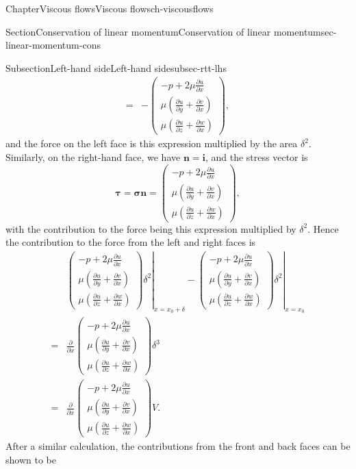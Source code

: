\documentclass[oneside,10pt,]{book}
\numberwithin{equation}{section}
\newcommand{\pd}[2]{\frac{\partial#1}{\partial#2}}
\newcommand{\bn}{\boldsymbol{n}}
\newcommand{\bsigma}{\boldsymbol{\sigma}}
\newcommand{\btau}{\boldsymbol{\tau}}
\newcommand{\bi}{\boldsymbol{i}}
\begin{document}
\begin{chapterptx}{Chapter}{Viscous flows}{}{Viscous flows}{}{}{ch-viscousflows}
\begin{sectionptx}{Section}{Conservation of linear momentum}{}{Conservation of linear momentum}{}{}{sec-linear-momentum-cons}
\begin{subsectionptx}{Subsection}{Left-hand side}{}{Left-hand side}{}{}{subsec-rtt-lhs}
\begin{align*}
=&-\left(\begin{matrix}
-p+2\mu\pd{u}{x}\\
\mu\left(\pd{u}{y}+\pd{v}{x}\right)\\
\mu\left(\pd{u}{z}+\pd{w}{x}\right)
\end{matrix}\right),
\end{align*}
and the force on the left face is this expression multiplied by the area \(\delta^2\). Similarly, on the right-hand face, we have \(\bn=\bi\), and the stress vector is%
\begin{equation*}
\btau=\bsigma\bn
=\left(\begin{matrix}
-p+2\mu\pd{u}{x}\\
\mu\left(\pd{u}{y}+\pd{v}{x}\right)\\
\mu\left(\pd{u}{z}+\pd{w}{x}\right)
\end{matrix}\right),
\end{equation*}
with the contribution to the force being this expression multiplied by \(\delta^2\). Hence the contribution to the force from the left and right faces is%
\begin{align*}
&\left.\left(\begin{matrix}
-p+2\mu\pd{u}{x}\\
\mu\left(\pd{u}{y}+\pd{v}{x}\right)\\
\mu\left(\pd{u}{z}+\pd{w}{x}\right)
\end{matrix}\right)\delta^2\right|_{x=x_0+\delta}
-\left.\left(\begin{matrix}
-p+2\mu\pd{u}{x}\\
\mu\left(\pd{u}{y}+\pd{v}{x}\right)\\
\mu\left(\pd{u}{z}+\pd{w}{x}\right)
\end{matrix}\right)\delta^2\right|_{x=x_0}\\
=&\pd{}{x}\left(\begin{matrix}
-p+2\mu\pd{u}{x}\\
\mu\left(\pd{u}{y}+\pd{v}{x}\right)\\
\mu\left(\pd{u}{z}+\pd{w}{x}\right)
\end{matrix}\right)\delta^3\\
=&\pd{}{x}\left(\begin{matrix}
-p+2\mu\pd{u}{x}\\
\mu\left(\pd{u}{y}+\pd{v}{x}\right)\\
\mu\left(\pd{u}{z}+\pd{w}{x}\right)
\end{matrix}\right)V.
\end{align*}
After a similar calculation, the contributions from the front and back faces can be shown to be%

\end{subsectionptx}
\end{sectionptx}
\end{chapterptx}
\end{document}
